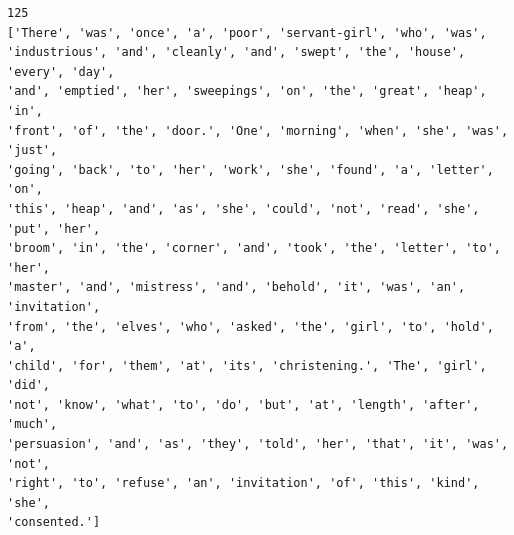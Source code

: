 \documentclass[11pt]{article}
\begin{document}
    \begin{Verbatim}[commandchars=\\\{\}]
125
['There', 'was', 'once', 'a', 'poor', 'servant-girl', 'who', 'was',
'industrious', 'and', 'cleanly', 'and', 'swept', 'the', 'house', 'every', 'day',
'and', 'emptied', 'her', 'sweepings', 'on', 'the', 'great', 'heap', 'in',
'front', 'of', 'the', 'door.', 'One', 'morning', 'when', 'she', 'was', 'just',
'going', 'back', 'to', 'her', 'work', 'she', 'found', 'a', 'letter', 'on',
'this', 'heap', 'and', 'as', 'she', 'could', 'not', 'read', 'she', 'put', 'her',
'broom', 'in', 'the', 'corner', 'and', 'took', 'the', 'letter', 'to', 'her',
'master', 'and', 'mistress', 'and', 'behold', 'it', 'was', 'an', 'invitation',
'from', 'the', 'elves', 'who', 'asked', 'the', 'girl', 'to', 'hold', 'a',
'child', 'for', 'them', 'at', 'its', 'christening.', 'The', 'girl', 'did',
'not', 'know', 'what', 'to', 'do', 'but', 'at', 'length', 'after', 'much',
'persuasion', 'and', 'as', 'they', 'told', 'her', 'that', 'it', 'was', 'not',
'right', 'to', 'refuse', 'an', 'invitation', 'of', 'this', 'kind', 'she',
'consented.']
    \end{Verbatim}
\end{document}

